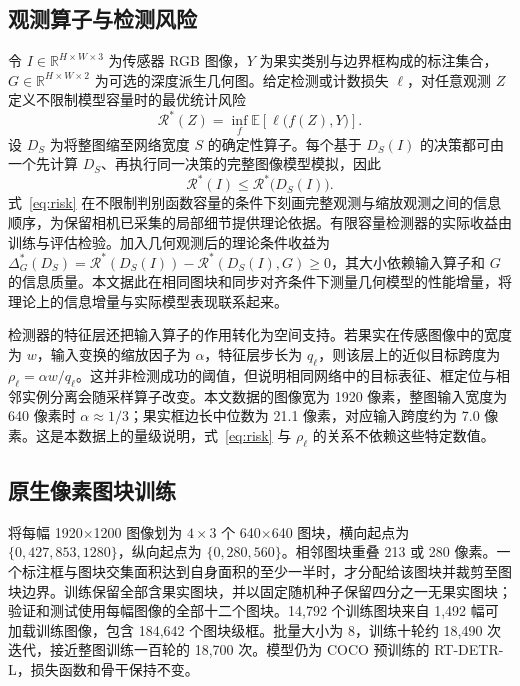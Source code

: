 \documentclass[11pt,a4paper]{ctexart}
\begin{document}
\subsection{观测算子与检测风险}
\label{sec:observation}
令 $I\in\mathbb{R}^{H\times W\times3}$ 为传感器 RGB 图像，$Y$ 为果实类别与边界框构成的标注集合，$G\in\mathbb{R}^{H\times W\times2}$ 为可选的深度派生几何图。给定检测或计数损失 $\ell$，对任意观测 $Z$ 定义不限制模型容量时的最优统计风险
\begin{equation}
\mathcal{R}^{*}(Z)=\inf_{f}\mathbb{E}\!\left[\ell\bigl(f(Z),Y\bigr)\right].
\end{equation}
设 $D_S$ 为将整图缩至网络宽度 $S$ 的确定性算子。每个基于 $D_S(I)$ 的决策都可由一个先计算 $D_S$、再执行同一决策的完整图像模型模拟，因此
\begin{equation}
\mathcal{R}^{*}(I)\leq\mathcal{R}^{*}\!\bigl(D_S(I)\bigr).
\label{eq:risk}
\end{equation}
式~\eqref{eq:risk} 在不限制判别函数容量的条件下刻画完整观测与缩放观测之间的信息顺序，为保留相机已采集的局部细节提供理论依据。有限容量检测器的实际收益由训练与评估检验。加入几何观测后的理论条件收益为 $\Delta_G^{*}(D_S)=\mathcal{R}^{*}(D_S(I))-\mathcal{R}^{*}(D_S(I),G)\geq0$，其大小依赖输入算子和 $G$ 的信息质量。本文据此在相同图块和同步对齐条件下测量几何模型的性能增量，将理论上的信息增量与实际模型表现联系起来。

检测器的特征层还把输入算子的作用转化为空间支持。若果实在传感图像中的宽度为 $w$，输入变换的缩放因子为 $\alpha$，特征层步长为 $q_\ell$，则该层上的近似目标跨度为 $\rho_\ell=\alpha w/q_\ell$。这并非检测成功的阈值，但说明相同网络中的目标表征、框定位与相邻实例分离会随采样算子改变。本文数据的图像宽为 1920 像素，整图输入宽度为 640 像素时 $\alpha\approx1/3$；果实框边长中位数为 21.1 像素，对应输入跨度约为 7.0 像素。这是本数据上的量级说明，式~\eqref{eq:risk} 与 $\rho_\ell$ 的关系不依赖这些特定数值。

\subsection{原生像素图块训练}

将每幅 1920$\times$1200 图像划为 $4\times3$ 个 640$\times$640 图块，横向起点为 $\{0,427,853,1280\}$，纵向起点为 $\{0,280,560\}$。相邻图块重叠 213 或 280 像素。一个标注框与图块交集面积达到自身面积的至少一半时，才分配给该图块并裁剪至图块边界。训练保留全部含果实图块，并以固定随机种子保留四分之一无果实图块；验证和测试使用每幅图像的全部十二个图块。14,792 个训练图块来自 1,492 幅可加载训练图像，包含 184,642 个图块级框。批量大小为 8，训练十轮约 18,490 次迭代，接近整图训练一百轮的 18,700 次。模型仍为 COCO 预训练的 RT-DETR-L，损失函数和骨干保持不变。
\end{document}
